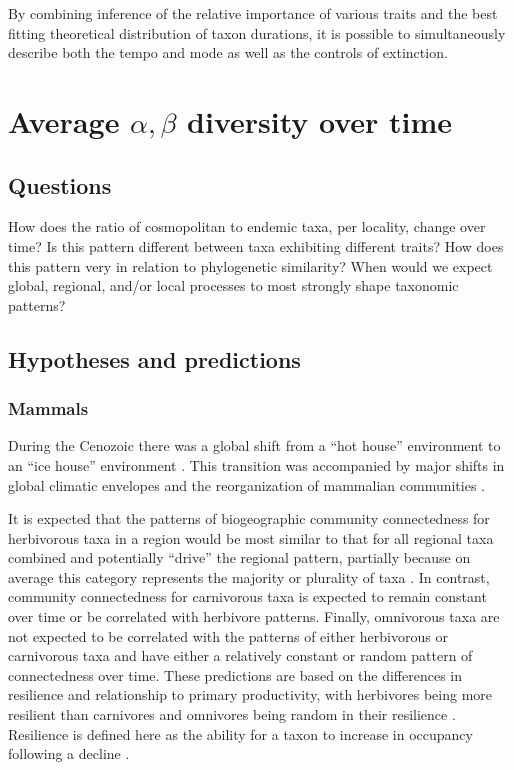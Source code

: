 \documentclass[12pt,letterpaper]{article}
\begin{document}
By combining inference of the relative importance of various traits and the best fitting theoretical distribution of taxon durations, it is possible to simultaneously describe both the tempo and mode as well as the controls of extinction.


\section{Average \(\alpha, \beta\) diversity over time}
\subsection{Questions}
How does the ratio of cosmopolitan to endemic taxa, per locality, change over time? Is this pattern different between taxa exhibiting different traits? How does this pattern very in relation to phylogenetic similarity? When would we expect global, regional, and/or local processes to most strongly shape taxonomic patterns?

\subsection{Hypotheses and predictions}
\subsubsection{Mammals}
During the Cenozoic there was a global shift from a ``hot house'' environment to an ``ice house'' environment \citep{Zachos2008,Zachos2001}. This transition was accompanied by major shifts in global climatic envelopes and the reorganization of mammalian communities \citep{Janis1993a,Fortelius2002,Blois2009,Alroy2000g,Figueirido2012}. 

It is expected that the patterns of biogeographic community connectedness for herbivorous taxa in a region would be most similar to that for all regional taxa combined and potentially ``drive'' the regional pattern, partially because on average this category represents the majority or plurality of taxa \citep{Jernvall2002}. In contrast, community connectedness for carnivorous taxa is expected to remain constant over time or be correlated with herbivore patterns. Finally, omnivorous taxa are not expected to be correlated with the patterns of either herbivorous or carnivorous taxa and have either a relatively constant or random pattern of connectedness over time.  These predictions are based on the differences in resilience and relationship to primary productivity, with herbivores being more resilient than carnivores and omnivores being random in their resilience \citep{Jernvall2004}. Resilience is defined here as the ability for a taxon to increase in occupancy following a decline \citep{Jernvall2004}.
\end{document}
